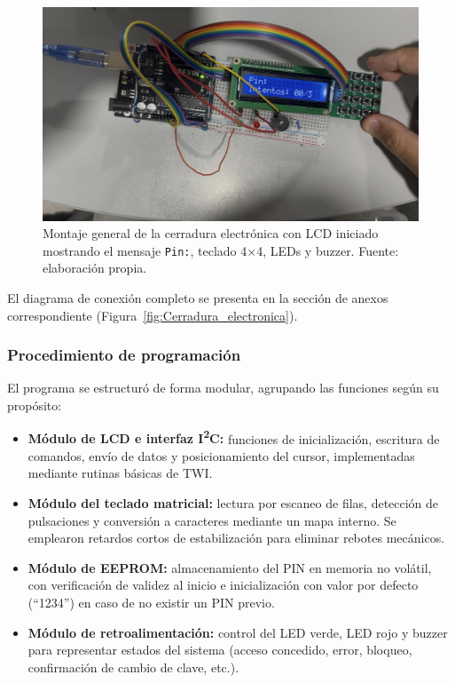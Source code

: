 \begin{figure}[H]
    \centering
    \includegraphics[width=0.8\columnwidth]{Anexos/Cerradura_Inicializada.png}
    \caption{Montaje general de la cerradura electrónica con LCD iniciado mostrando el mensaje \texttt{Pin:}, teclado 4×4, LEDs y buzzer. Fuente: elaboración propia.}
    \label{fig:cerradura_inicio}
\end{figure}

El diagrama de conexión completo se presenta en la sección de anexos correspondiente (Figura~\ref{fig:Cerradura_electronica}).

\subsubsection{Procedimiento de programación}

El programa se estructuró de forma modular, agrupando las funciones según su propósito:
\begin{itemize}
    \item \textbf{Módulo de LCD e interfaz I\textsuperscript{2}C:} funciones de inicialización, escritura de comandos, envío de datos y posicionamiento del cursor, 
    implementadas mediante rutinas básicas de TWI.
    \item \textbf{Módulo del teclado matricial:} lectura por escaneo de filas, detección de pulsaciones y conversión a caracteres mediante un mapa interno. 
    Se emplearon retardos cortos de estabilización para eliminar rebotes mecánicos.
    \item \textbf{Módulo de EEPROM:} almacenamiento del PIN en memoria no volátil, con verificación de validez al inicio 
    e inicialización con valor por defecto (“1234”) en caso de no existir un PIN previo.
    \item \textbf{Módulo de retroalimentación:} control del LED verde, LED rojo y buzzer para representar estados del sistema 
    (acceso concedido, error, bloqueo, confirmación de cambio de clave, etc.).
\end{itemize}

